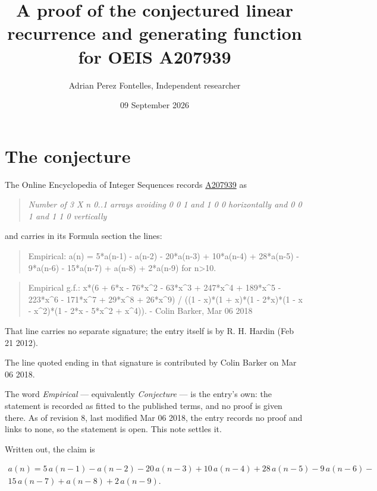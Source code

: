 \documentclass[11pt]{article}
\title{A proof of the conjectured linear recurrence and generating function for OEIS A207939}
\author{Adrian Perez Fontelles, Independent researcher}
\date{09 September 2026}
\theoremstyle{definition}
\begin{document}
\maketitle
\section{The conjecture}

The Online Encyclopedia of Integer Sequences records \href{https://oeis.org/A207939}{A207939} as

\begin{quote}\itshape Number of 3 X n 0..1 arrays avoiding 0 0 1 and 1 0 0 horizontally and 0 0 1 and 1 1 0 vertically\end{quote}

and carries in its Formula section the lines:

\begin{quote}\ttfamily Empirical: a(n) = 5*a(n-1) - a(n-2) - 20*a(n-3) + 10*a(n-4) + 28*a(n-5) - 9*a(n-6) - 15*a(n-7) + a(n-8) + 2*a(n-9) for n>10.\end{quote}

\begin{quote}\ttfamily Empirical g.f.: x*(6 + 6*x - 76*x\textasciicircum{}2 - 63*x\textasciicircum{}3 + 247*x\textasciicircum{}4 + 189*x\textasciicircum{}5 - 223*x\textasciicircum{}6 - 171*x\textasciicircum{}7 + 29*x\textasciicircum{}8 + 26*x\textasciicircum{}9) / ((1 - x)*(1 + x)*(1 - 2*x)*(1 - x - x\textasciicircum{}2)*(1 - 2*x - 5*x\textasciicircum{}2 + x\textasciicircum{}4)). - Colin Barker, Mar 06 2018\end{quote}

That line carries no separate signature; the entry itself is by R. H. Hardin (Feb 21 2012).

The line quoted ending in that signature is contributed by Colin Barker on Mar 06 2018.

The word {\itshape Empirical} --- equivalently {\itshape Conjecture} --- is the entry's own: the statement is recorded as fitted to the published terms, and no proof is given there. As of revision 8, last modified Mar 06 2018, the entry records no proof and links to none, so the statement is open. This note settles it.

Written out, the claim is

\begin{multline*} a(n) = 5\,a(n-1) - a(n-2) - 20\,a(n-3) + 10\,a(n-4) + 28\,a(n-5) - 9\,a(n-6) - \\ 15\,a(n-7) + a(n-8) + 2\,a(n-9). \end{multline*}
\end{document}
